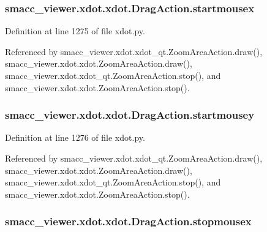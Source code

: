 \subsubsection[{\texorpdfstring{startmousex}{startmousex}}]{\setlength{\rightskip}{0pt plus 5cm}smacc\+\_\+viewer.\+xdot.\+xdot.\+Drag\+Action.\+startmousex}\hypertarget{classsmacc__viewer_1_1xdot_1_1xdot_1_1DragAction_a74ba8eeebd63d491c9f098a61cf8d3e7}{}\label{classsmacc__viewer_1_1xdot_1_1xdot_1_1DragAction_a74ba8eeebd63d491c9f098a61cf8d3e7}


Definition at line 1275 of file xdot.\+py.



Referenced by smacc\+\_\+viewer.\+xdot.\+xdot\+\_\+qt.\+Zoom\+Area\+Action.\+draw(), smacc\+\_\+viewer.\+xdot.\+xdot.\+Zoom\+Area\+Action.\+draw(), smacc\+\_\+viewer.\+xdot.\+xdot\+\_\+qt.\+Zoom\+Area\+Action.\+stop(), and smacc\+\_\+viewer.\+xdot.\+xdot.\+Zoom\+Area\+Action.\+stop().

\subsubsection[{\texorpdfstring{startmousey}{startmousey}}]{\setlength{\rightskip}{0pt plus 5cm}smacc\+\_\+viewer.\+xdot.\+xdot.\+Drag\+Action.\+startmousey}\hypertarget{classsmacc__viewer_1_1xdot_1_1xdot_1_1DragAction_af2d60d0dc600392bdee19260e8a6dabc}{}\label{classsmacc__viewer_1_1xdot_1_1xdot_1_1DragAction_af2d60d0dc600392bdee19260e8a6dabc}


Definition at line 1276 of file xdot.\+py.



Referenced by smacc\+\_\+viewer.\+xdot.\+xdot\+\_\+qt.\+Zoom\+Area\+Action.\+draw(), smacc\+\_\+viewer.\+xdot.\+xdot.\+Zoom\+Area\+Action.\+draw(), smacc\+\_\+viewer.\+xdot.\+xdot\+\_\+qt.\+Zoom\+Area\+Action.\+stop(), and smacc\+\_\+viewer.\+xdot.\+xdot.\+Zoom\+Area\+Action.\+stop().

\subsubsection[{\texorpdfstring{stopmousex}{stopmousex}}]{\setlength{\rightskip}{0pt plus 5cm}smacc\+\_\+viewer.\+xdot.\+xdot.\+Drag\+Action.\+stopmousex}\hypertarget{classsmacc__viewer_1_1xdot_1_1xdot_1_1DragAction_ad7a955bd4e82ee45c702fcdc045b8b8e}{}\label{classsmacc__viewer_1_1xdot_1_1xdot_1_1DragAction_ad7a955bd4e82ee45c702fcdc045b8b8e}


